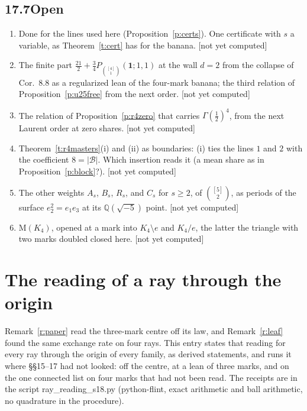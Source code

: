 \documentclass[11pt]{article}
\newcommand{\cB}{\mathcal B}
\newcommand{\one}{\mathbf 1}
\newcommand{\Pfour}{P_{\binom{[4]}1}(\one;1,1)}
\theoremstyle{plain}
\theoremstyle{definition}
\theoremstyle{remark}
\renewcommand{\thesection}{15}
\renewcommand{\theproposition}{15.\arabic{proposition}}
\newcommand{\notyet}{\textup{[not yet computed]}}
\begin{document}
\subsection*{17.7\quad Open}

\begin{enumerate}[label=(\roman*)]
\item Done for the lines used here (Proposition~\ref{p:certs}). One certificate with $s$ a variable, as Theorem~\ref{t:cert} has for the banana. \notyet
\item The finite part $\frac{21}2+\frac34\Pfour$ at the wall $d=2$ from the collapse of Cor.~8.8 as a regularized lean of the four-mark banana; the third relation of Proposition~\ref{p:u25free} from the next order. \notyet
\item The relation of Proposition~\ref{p:r4zero} that carries $\Gamma(\frac12)^4$, from the next Laurent order at zero shares. \notyet
\item Theorem~\ref{t:r4masters}(i) and (ii) as boundaries: (i) ties the lines $1$ and $2$ with the coefficient $8=|\cB|$. Which insertion reads it (a mean share as in Proposition~\ref{p:block}?). \notyet
\item The other weights $A_s$, $B_s$, $R_s$, and $C_s$ for $s\ge2$, of $\binom{[5]}2$, as periods of the surface $e_2^2=e_1e_3$ at its $\mathbb Q(\sqrt{-5})$ point. \notyet
\item $\mathrm M(K_4)$, opened at a mark into $K_4\setminus e$ and $K_4/e$, the latter the triangle with two marks doubled closed here. \notyet
\end{enumerate}


\renewcommand{\thesection}{18}
\setcounter{proposition}{0}
\renewcommand{\theproposition}{18.\arabic{proposition}}

\section{The reading of a ray through the origin}

Remark~\ref{r:paper} read the three-mark centre off its law, and Remark~\ref{r:leaf} found the same exchange rate on four rays. This entry states that reading for every ray through the origin of every family, as derived statements, and runs it where \S\S15--17 had not looked: off the centre, at a lean of three marks, and on the one connected list on four marks that had not been read. The receipts are in the script ray\_reading\_s18.py (python-flint, exact arithmetic and ball arithmetic, no quadrature in the procedure).
\end{document}
